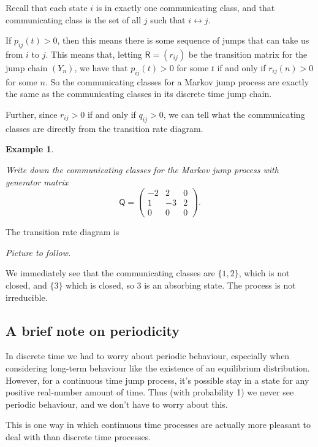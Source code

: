 \documentclass[
  a4paper,
]{article}
\theoremstyle{definition}
\theoremstyle{definition}
\newtheorem{example}{Example}[section]
\theoremstyle{definition}
\theoremstyle{remark}
\begin{document}
Recall that each state \(i\) is in exactly one communicating class, and that communicating class is the set of all \(j\) such that \(i \leftrightarrow j\).

If \(p_{ij}(t) > 0\), then this means there is some sequence of jumps that can take us from \(i\) to \(j\). This means that, letting \(\mathsf R = (r_{ij})\) be the transition matrix for the jump chain \((Y_n)\), we have that \(p_{ij}(t) > 0\) for some \(t\) if and only if \(r_{ij}(n) > 0\) for some \(n\). So the communicating classes for a Markov jump process are exactly the same as the communicating classes in its discrete time jump chain.

Further, since \(r_{ij} > 0\) if and only if \(q_{ij} > 0\), we can tell what the communicating classes are directly from the transition rate diagram.

\begin{example}
\protect\hypertarget{exm:jump-classes}{}\label{exm:jump-classes}

\emph{Write down the communicating classes for the Markov jump process with generator matrix}
\[ \mathsf Q = \begin{pmatrix} -2 & 2 & 0 \\ 1 & -3 & 2 \\ 0 & 0 & 0 \end{pmatrix}. \]

The transition rate diagram is

\emph{Picture to follow.}

We immediately see that the communicating classes are \(\{1,2\}\), which is not closed, and \(\{3\}\) which is closed, so 3 is an absorbing state. The process is not irreducible.

\end{example}

\hypertarget{periods2}{%
\subsection{A brief note on periodicity}\label{periods2}}

In discrete time we had to worry about periodic behaviour, especially when considering long-term behaviour like the existence of an equilibrium distribution. However, for a continuous time jump process, it's possible stay in a state for any positive real-number amount of time. Thus (with probability 1) we never see periodic behaviour, and we don't have to worry about this.

This is one way in which continuous time processes are actually more pleasant to deal with than discrete time processes.
\end{document}
